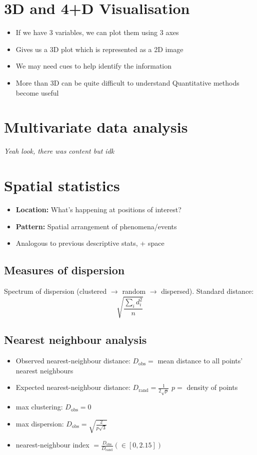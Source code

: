 \section{3D and 4+D Visualisation}
\begin{itemize}
	\item If we have 3 variables, we can plot them using 3 axes
	\item Gives us a 3D plot which is represented as a 2D image
	\item We may need cues to help identify the information
	\item More than 3D can be quite difficult to understand
	\subitem Quantitative methods become useful	
\end{itemize}


\section{Multivariate data analysis}
\textit{Yeah look, there was content but idk}

\section{Spatial statistics}
\begin{itemize}
	\item\textbf{Location:} What's happening at positions of interest?
	\item\textbf{Pattern:} Spatial arrangement of phenomena/events
	\item Analogous to previous descriptive stats, + space
\end{itemize}	

\subsection{Measures of dispersion}
Spectrum of dispersion (clustered $\rightarrow$ random $\rightarrow$ dispersed). Standard distance:
\[\sqrt{
	\frac{\sum_i{d_i^2}}
		{n}
}\]

\subsection{Nearest neighbour analysis}
\begin{itemize}
	\item Observed nearest-neighbour distance: $D_\text{obs} =$ mean distance to all points' nearest neighbours
	\item Expected nearest-neighbour distance: $D_\text{rand}=\frac{1}{2\sqrt{p}}$
	\subitem $p=$ density of points
	\item max clustering: $D_\text{obs}=0$
	\item max dispersion: $D_\text{obs}=\sqrt{\frac{2}{p\sqrt{3}}}$
	\item nearest-neighbour index $= \frac{D_\text{obs}}{D_\text{rand}} (\in [0, 2.15])$	
\end{itemize}
